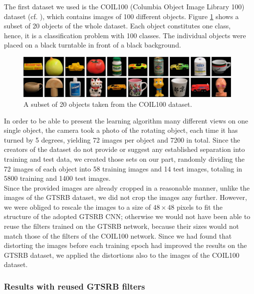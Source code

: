 \documentclass[11pt, a4paper]{article}
\begin{document}
The first dataset we used is the COIL100 (Columbia Object Image Library 100) dataset (cf. \cite{columbia_object_image_library}), which contains images of 100 different objects. Figure \ref{fig:coil100_objects} shows a subset of 20 objects of the whole dataset. Each object constitutes one class, hence, it is a classification problem with 100 classes. The individual objects were placed on a black turntable in front of a black background. 
\begin{figure}[h!]
	\centering
	\includegraphics[width=1\textwidth]{coil100}
	\caption{A subset of 20 objects taken from the COIL100 dataset.}
	\label{fig:coil100_objects}
\end{figure}
In order to be able to present the learning algorithm many different views on one single object, the camera took a photo of the rotating object, each time it has turned by 5 degrees, yielding 72 images per object and 7200 in total. Since the creators of the dataset do not provide or suggest any established separation into training and test data, we created those sets on our part, randomly dividing the 72 images of each object into 58 training images and 14 test images, totaling in 5800 training and 1400 test images.\\
Since the provided images are already cropped in a reasonable manner, unlike the images of the GTSRB dataset, we did not crop the images any further. However, we were obliged to rescale the images to a size of $48 \times 48$ pixels to fit the structure of the adopted GTSRB CNN; otherwise we would not have been able to reuse the filters trained on the GTSRB network, because their sizes would not match those of the filters of the COIL100 network. Since we had found that distorting the images before each training epoch had improved the results on the GTSRB dataset, we applied the distortions also to the images of the COIL100 dataset.

\subsubsection{Results with reused GTSRB filters}
\end{document}
